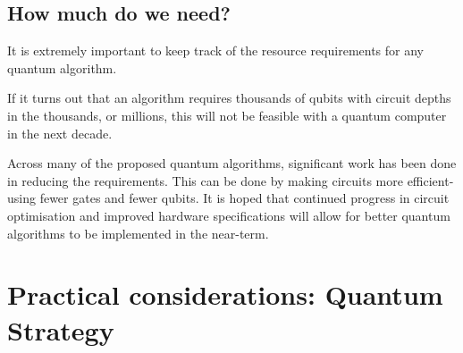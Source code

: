 \subsection{How much do we need?}

It is extremely important to keep track of the resource requirements for any quantum algorithm. 

If it turns out that an algorithm requires thousands of qubits with circuit depths in the thousands, or millions, this will not be feasible with a quantum computer in the next decade. 

Across many of the proposed quantum algorithms, significant work has been done in reducing the requirements. This can be done by making circuits more efficient- using fewer gates and fewer qubits.  It is hoped that continued progress in circuit optimisation and improved hardware specifications will allow for better quantum algorithms to be implemented in the near-term. 


\section{Practical considerations: Quantum Strategy}

